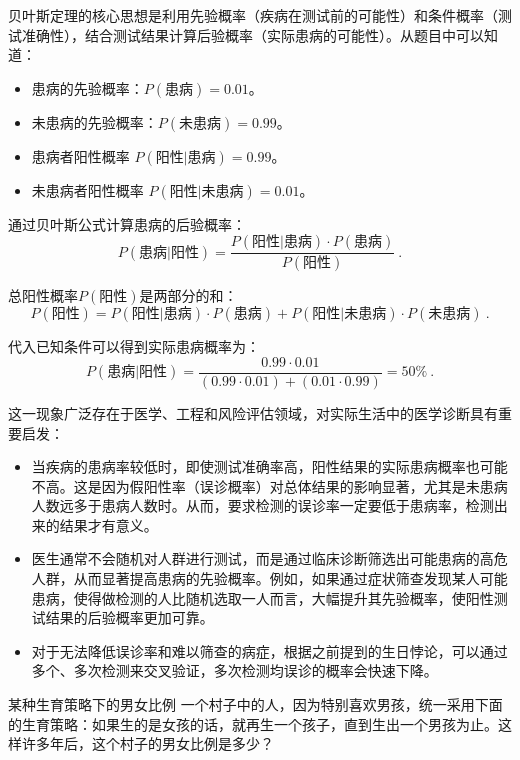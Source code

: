 贝叶斯定理的核心思想是利用先验概率（疾病在测试前的可能性）和条件概率（测试准确性），结合测试结果计算后验概率（实际患病的可能性）。从题目中可以知道：

\begin{itemize}
\item 患病的先验概率：$P(\text{患病}) = 0.01$。
\item 未患病的先验概率：$P(\text{未患病}) = 0.99$。
\item 患病者阳性概率 $P(\text{阳性}|\text{患病}) = 0.99$。
\item 未患病者阳性概率 $P(\text{阳性}|\text{未患病}) = 0.01$。
\end{itemize}

通过贝叶斯公式计算患病的后验概率：
\begin{equation}
P(\text{患病}|\text{阳性}) = \frac{P(\text{阳性}|\text{患病}) \cdot P(\text{患病})}{P(\text{阳性})}~.
\end{equation}

总阳性概率$P(\text{阳性})$是两部分的和：
\begin{equation}
P(\text{阳性}) = P(\text{阳性}|\text{患病}) \cdot P(\text{患病}) + P(\text{阳性}|\text{未患病}) \cdot P(\text{未患病})~.
\end{equation}

代入已知条件可以得到实际患病概率为：
\begin{equation}
P(\text{患病}|\text{阳性}) = \frac{0.99 \cdot 0.01}{(0.99 \cdot 0.01) + (0.01 \cdot 0.99)}= 50\%~.
\end{equation}

这一现象广泛存在于医学、工程和风险评估领域，对实际生活中的医学诊断具有重要启发：
\begin{itemize}
\item 当疾病的患病率较低时，即使测试准确率高，阳性结果的实际患病概率也可能不高。这是因为假阳性率（误诊概率）对总体结果的影响显著，尤其是未患病人数远多于患病人数时。从而，要求检测的误诊率一定要低于患病率，检测出来的结果才有意义。
\item 医生通常不会随机对人群进行测试，而是通过临床诊断筛选出可能患病的高危人群，从而显著提高患病的先验概率。例如，如果通过症状筛查发现某人可能患病，使得做检测的人比随机选取一人而言，大幅提升其先验概率，使阳性测试结果的后验概率更加可靠。
\item 对于无法降低误诊率和难以筛查的病症，根据之前提到的生日悖论，可以通过多个、多次检测来交叉验证，多次检测均误诊的概率会快速下降。
\end{itemize}

\begin{example}{某种生育策略下的男女比例}
一个村子中的人，因为特别喜欢男孩，统一采用下面的生育策略：如果生的是女孩的话，就再生一个孩子，直到生出一个男孩为止。这样许多年后，这个村子的男女比例是多少？
\end{example}

